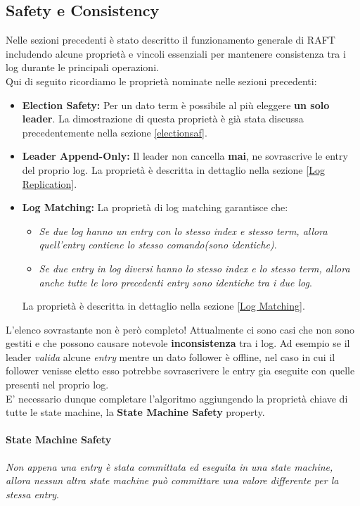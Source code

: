 \subsection{Safety e Consistency}
Nelle sezioni precedenti è stato descritto il funzionamento generale di RAFT includendo alcune proprietà e vincoli essenziali per mantenere consistenza tra i log durante le principali operazioni.\\
Qui di seguito ricordiamo le proprietà nominate nelle sezioni precedenti:

\begin{itemize}
	\item{\textbf{Election Safety:}} 
  Per un dato term è possibile al più eleggere \textbf{un solo leader}.
	La dimostrazione di questa proprietà è già stata discussa precedentemente nella sezione \ref{electionsaf}.
	\item{\textbf{Leader Append-Only:}}
  Il leader non cancella \textbf{mai}, ne sovrascrive le entry del proprio log.
  La proprietà è descritta in dettaglio nella sezione \ref{Log Replication}.
	\item{\textbf{Log Matching:}}
  La proprietà di log matching garantisce che:
	\begin{itemize}
		\item{\emph{Se due log hanno un entry con lo stesso index e stesso term, allora quell'entry contiene lo stesso comando(sono identiche)}}.
		\item{\emph{Se due \textit{entry} in log diversi hanno lo stesso index e lo stesso term, allora anche tutte le loro precedenti entry sono identiche tra i due log}}.
	\end{itemize}
	La proprietà è descritta in dettaglio nella sezione \ref{Log Matching}.
\end{itemize}
L'elenco sovrastante non è però completo! Attualmente ci sono casi che non sono gestiti e che possono causare notevole \textbf{inconsistenza} tra i log.
Ad esempio se il leader \textit{valida} alcune \textit{entry} mentre un dato follower è offline, nel caso in cui il follower venisse eletto esso potrebbe sovrascrivere le entry gia eseguite con quelle presenti nel proprio log.\\
E' necessario dunque completare l'algoritmo aggiungendo la proprietà chiave di tutte le state machine, la \textbf{State Machine Safety} property. 

  \paragraph{State Machine Safety}
  \emph{Non appena una entry è stata committata ed eseguita in una state machine, allora nessun altra state machine può committare una valore differente per la stessa entry}.



